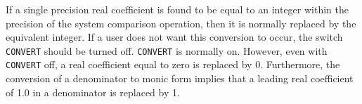If a single precision real coefficient is found to be equal to an integer
within the precision of the system comparison operation, then it is
normally replaced by the equivalent integer.  If a user does not want this
conversion to occur, the switch {\tt CONVERT}  should be
turned off. {\tt CONVERT} is normally on.  However, even with
{\tt CONVERT} off, a real coefficient equal to zero is replaced by 0.
Furthermore, the conversion of a denominator to monic form implies that a
leading real coefficient of 1.0 in a denominator is replaced by 1.

